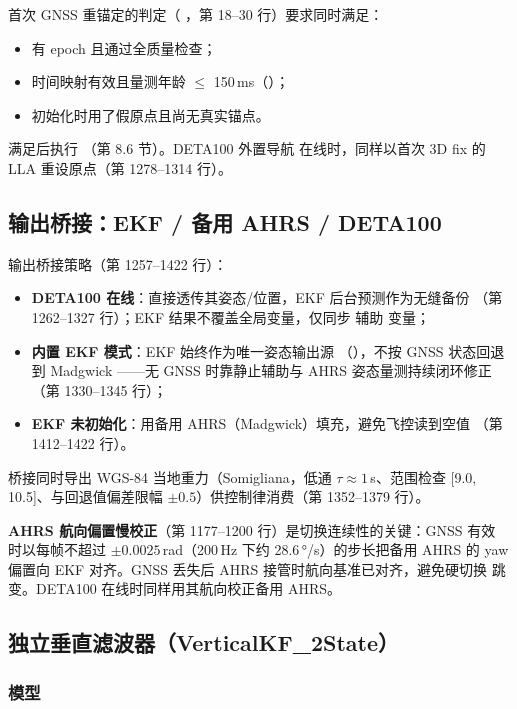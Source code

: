 首次 GNSS 重锚定的判定（
，第 18--30 行）要求同时满足：
\begin{itemize}
  \item 有 epoch 且通过全质量检查；
  \item 时间映射有效且量测年龄 $\le$ 150\,ms（）；
  \item 初始化时用了假原点且尚无真实锚点。
\end{itemize}
满足后执行 （第 8.6 节）。DETA100 外置导航
在线时，同样以首次 3D fix 的 LLA 重设原点（第 1278--1314 行）。

\subsection{输出桥接：EKF / 备用 AHRS / DETA100}

输出桥接策略（第 1257--1422 行）：
\begin{itemize}
  \item \textbf{DETA100 在线}：直接透传其姿态/位置，EKF 后台预测作为无缝备份
    （第 1262--1327 行）；EKF 结果不覆盖全局变量，仅同步  辅助
    变量；
  \item \textbf{内置 EKF 模式}：EKF 始终作为唯一姿态输出源
    （），不按 GNSS 状态回退到 Madgwick
    ——无 GNSS 时靠静止辅助与 AHRS 姿态量测持续闭环修正（第 1330--1345 行）；
  \item \textbf{EKF 未初始化}：用备用 AHRS（Madgwick）填充，避免飞控读到空值
    （第 1412--1422 行）。
\end{itemize}
桥接同时导出 WGS-84 当地重力（Somigliana，低通 $\tau\approx1$\,s、范围检查
[9.0, 10.5]、与回退值偏差限幅 $\pm0.5$）供控制律消费（第 1352--1379 行）。

\begin{remark}
\textbf{AHRS 航向偏置慢校正}（第 1177--1200 行）是切换连续性的关键：GNSS 有效
时以每帧不超过 $\pm0.0025$\,rad（200\,Hz 下约 28.6\,°/s）的步长把备用 AHRS
的 yaw 偏置向 EKF 对齐。GNSS 丢失后 AHRS 接管时航向基准已对齐，避免硬切换
跳变。DETA100 在线时同样用其航向校正备用 AHRS。
\end{remark}

\subsection{独立垂直滤波器（VerticalKF\_2State）}

\subsubsection{模型}


